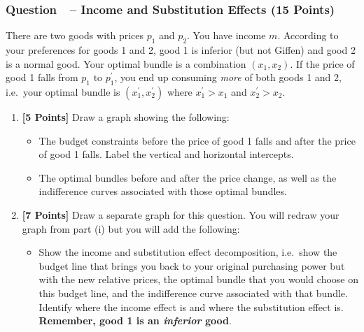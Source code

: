 \documentclass[10pt]{article}
\newcounter{question}[section]
\newcommand{\question}[1]{\refstepcounter{question}
  \subsubsection*{Question~\thequestion~-- #1}}
\newenvironment{subquestions}{
  \begin{enumerate}[label=(\roman*)]}{\end{enumerate}}
\begin{document}
\question{Income and Substitution Effects (15 Points)}
There are two goods with prices $p_1$ and $p_2$. You have income $m$. According to your preferences for goods 1 and 2, good 1 is inferior (but not Giffen) and good 2 is a normal good. Your optimal bundle is a combination $\left( x_1,x_2 \right)$. If the price of good 1 falls from $p_1$ to $p_1^\prime$, you end up consuming \emph{more} of both goods 1 and 2, i.e.~your optimal bundle is $\left( x_1^\prime,x_2^\prime \right)$ where $x_1^\prime>x_1$ and $x_2^\prime>x_2$.
\begin{subquestions}
  \item \textbf{[5 Points]} Draw a graph showing the following:
    \begin{itemize}
      \item The budget constraints before the price of good 1 falls and after the price of good 1 falls. Label the vertical and horizontal intercepts.
      \item The optimal bundles before and after the price change, as well as the indifference curves associated with those optimal bundles.
    \end{itemize}
  \item \textbf{[7 Points]} Draw a separate graph for this question. You will redraw your graph from part (i) but you will add the following:
    \begin{itemize}
      \item Show the income and substitution effect decomposition, i.e.~show the budget line that brings you back to your original purchasing power but with the new relative prices, the optimal bundle that you would choose on this budget line, and the indifference curve associated with that bundle. Identify where the income effect is and where the substitution effect is. \textbf{Remember, good 1 is an \emph{inferior} good}.

\end{itemize}
\end{subquestions}
\end{document}
